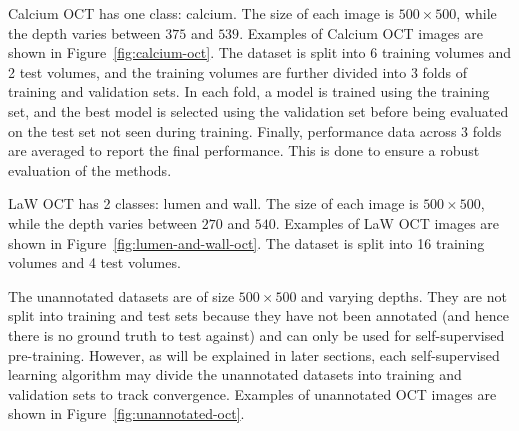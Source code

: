 \documentclass[a4paper,11pt,oneside]{report}
\begin{document}
Calcium OCT has one class: calcium. The size of each image is $500\times 500$, while the depth varies between $375$ and $539$. Examples of Calcium OCT images are shown in Figure~\ref{fig:calcium-oct}. The dataset is split into 6 training volumes and 2 test volumes, and the training volumes are further divided into 3 folds of training and validation sets. In each fold, a model is trained using the training set, and the best model is selected using the validation set before being evaluated on the test set not seen during training. Finally, performance data across 3 folds are averaged to report the final performance. This is done to ensure a robust evaluation of the methods.

LaW OCT has 2 classes: lumen and wall. The size of each image is $500\times 500$, while the depth varies between $270$ and $540$. Examples of LaW OCT images are shown in Figure~\ref{fig:lumen-and-wall-oct}. The dataset is split into 16 training volumes and 4 test volumes. 

The unannotated datasets are of size $500\times 500$ and varying depths. They are not split into training and test sets because they have not been annotated (and hence there is no ground truth to test against) and can only be used for self-supervised pre-training. However, as will be explained in later sections, each self-supervised learning algorithm may divide the unannotated datasets into training and validation sets to track convergence. Examples of unannotated OCT images are shown in Figure~\ref{fig:unannotated-oct}.
\end{document}
